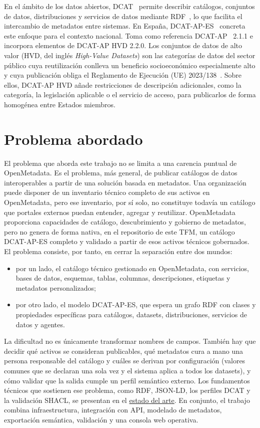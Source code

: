 En el ámbito de los datos abiertos, DCAT~\cite{w3cDcat3} permite describir catálogos, conjuntos de datos, distribuciones y servicios de datos mediante RDF~\cite{w3cRdf11}, lo que facilita el intercambio de metadatos entre sistemas. En España, DCAT-AP-ES~\cite{datosGobDcatApEs2025} concreta este enfoque para el contexto nacional. Toma como referencia DCAT-AP~\cite{europeDcatAp} 2.1.1 e incorpora elementos de DCAT-AP HVD 2.2.0. Los conjuntos de datos de alto valor (HVD, del inglés \emph{High-Value Datasets}) son las categorías de datos del sector público cuya reutilización conlleva un beneficio socioeconómico especialmente alto y cuya publicación obliga el Reglamento de Ejecución (UE) 2023/138~\cite{euHvdRegulation}. Sobre ellos, DCAT-AP HVD añade restricciones de descripción adicionales, como la categoría, la legislación aplicable o el servicio de acceso, para publicarlos de forma homogénea entre Estados miembros.

\section{Problema abordado}

El problema que aborda este trabajo no se limita a una carencia puntual de OpenMetadata. Es el problema, más general, de publicar catálogos de datos interoperables a partir de una solución basada en metadatos. Una organización puede disponer de un inventario técnico completo de sus activos en OpenMetadata, pero ese inventario, por sí solo, no constituye todavía un catálogo que portales externos puedan entender, agregar y reutilizar. OpenMetadata proporciona capacidades de catálogo, descubrimiento y gobierno de metadatos, pero no genera de forma nativa, en el repositorio de este TFM, un catálogo DCAT-AP-ES completo y validado a partir de esos activos técnicos gobernados. El problema consiste, por tanto, en cerrar la separación entre dos mundos:

\begin{itemize}
  \item por un lado, el catálogo técnico gestionado en OpenMetadata, con servicios, bases de datos, esquemas, tablas, columnas, descripciones, etiquetas y metadatos personalizados;
  \item por otro lado, el modelo DCAT-AP-ES, que espera un grafo RDF con clases y propiedades específicas para catálogos, datasets, distribuciones, servicios de datos y agentes.
\end{itemize}

La dificultad no es únicamente transformar nombres de campos. También hay que decidir qué activos se consideran publicables, qué metadatos cura a mano una persona responsable del catálogo y cuáles se derivan por configuración (valores comunes que se declaran una sola vez y el sistema aplica a todos los datasets), y cómo validar que la salida cumple un perfil semántico externo. Los fundamentos técnicos que sostienen ese problema, como RDF, JSON-LD, los perfiles DCAT y la validación SHACL, se presentan en el \hyperref[cap:estado-arte]{estado del arte}. En conjunto, el trabajo combina infraestructura, integración con API, modelado de metadatos, exportación semántica, validación y una consola web operativa.

